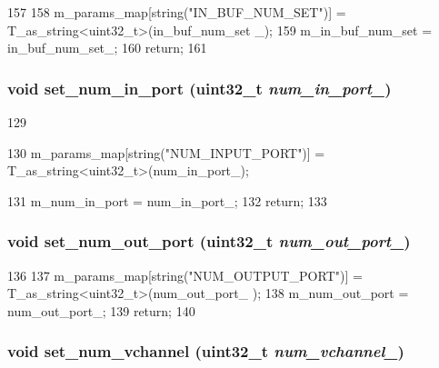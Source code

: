\begin{DoxyCode}
157 {
158     m_params_map[string("IN_BUF_NUM_SET")] = T_as_string<uint32_t>(in_buf_num_set
      _);
159     m_in_buf_num_set = in_buf_num_set_;
160     return;
161 }
\end{DoxyCode}
\hypertarget{classOrionConfig_a88b252fe7abe17472ffddc89edc69b48}{
\subsubsection[{set\_\-num\_\-in\_\-port}]{\setlength{\rightskip}{0pt plus 5cm}void set\_\-num\_\-in\_\-port ({\bf uint32\_\-t} {\em num\_\-in\_\-port\_\-})}}
\label{classOrionConfig_a88b252fe7abe17472ffddc89edc69b48}



\begin{DoxyCode}
129 {
130     m_params_map[string("NUM_INPUT_PORT")] = T_as_string<uint32_t>(num_in_port_);
      
131     m_num_in_port = num_in_port_;
132     return;
133 }
\end{DoxyCode}
\hypertarget{classOrionConfig_ab67f9bbbe7a8d146511dbbd76fd6e1ac}{
\subsubsection[{set\_\-num\_\-out\_\-port}]{\setlength{\rightskip}{0pt plus 5cm}void set\_\-num\_\-out\_\-port ({\bf uint32\_\-t} {\em num\_\-out\_\-port\_\-})}}
\label{classOrionConfig_ab67f9bbbe7a8d146511dbbd76fd6e1ac}



\begin{DoxyCode}
136 {
137     m_params_map[string("NUM_OUTPUT_PORT")] = T_as_string<uint32_t>(num_out_port_
      );
138     m_num_out_port = num_out_port_;
139     return;
140 }
\end{DoxyCode}
\hypertarget{classOrionConfig_ab71d47cd310c7c9cfaa29fdc98fbe323}{
\subsubsection[{set\_\-num\_\-vchannel}]{\setlength{\rightskip}{0pt plus 5cm}void set\_\-num\_\-vchannel ({\bf uint32\_\-t} {\em num\_\-vchannel\_\-})}}
\label{classOrionConfig_ab71d47cd310c7c9cfaa29fdc98fbe323}



